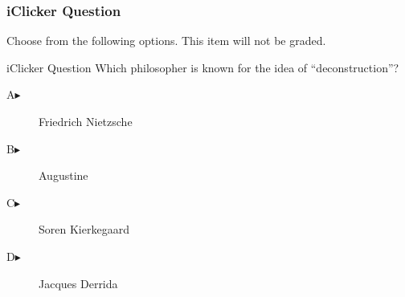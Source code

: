 \begin{frame}
  \frametitle{iClicker Question}
Choose from the following options. This item will not be graded.
\begin{block}{iClicker Question}
Which philosopher is known for the idea of ``deconstruction''?
\end{block}
\begin{description}
\item[A\hspace{.2in}$\blacktriangleright$] Friedrich Nietzsche
\item[B\hspace{.2in}$\blacktriangleright$] Augustine
\item[C\hspace{.2in}$\blacktriangleright$] S{\/o}ren Kierkegaard
\item[D\hspace{.2in}$\blacktriangleright$] Jacques Derrida
\end{description}
\end{frame}
